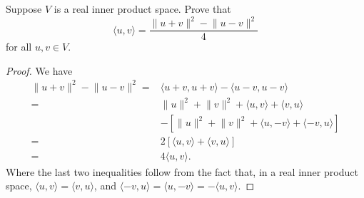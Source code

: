 \begin{exercise}{19}
  Suppose $V$ is a real inner product space. Prove that 
  \[
  \langle u,v\rangle=\frac{\lVert u+v\rVert^2-\lVert u-v\rVert^2}{4}
  \]
  for all $u,v\in V$.
\end{exercise}
\begin{proof}
 We have
 \begin{align*}
     \lVert u+v\rVert^2-\lVert u-v\rVert^2 =& \langle u+v,u+v\rangle - \langle u-v,u-v\rangle\\
     =&\lVert u\rVert^2+\lVert v\rVert^2+\langle u,v\rangle +\langle v,u\rangle\\
     &-[\lVert u\rVert^2+\lVert v\rVert^2+\langle u,-v\rangle+\langle -v,u\rangle]\\
     =& 2[\langle u,v\rangle+\langle v, u\rangle]\\
     =& 4\langle u,v\rangle.
 \end{align*}
Where the last two inequalities follow from the fact that, in a real inner product space, $\langle u,v\rangle=\langle v,u\rangle$, and $\langle -v,u\rangle=\langle u,-v\rangle=-\langle u,v\rangle$.
\end{proof}

